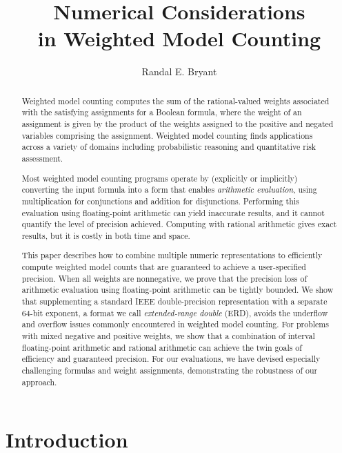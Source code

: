 \documentclass{easychair}
\title{Numerical Considerations \\in Weighted Model Counting}
\author{Randal E. Bryant}
\institute{
  Carnegie Mellon University \\
  Pittsburgh, Pennsylvania 15221, USA
}
\begin{document}
\maketitle

\begin{abstract}
 Weighted model counting computes the sum of the rational-valued weights
  associated with the satisfying assignments for a Boolean formula,
  where the weight of an assignment is given by the product of the
  weights assigned to the positive and negated variables
  comprising the assignment.  Weighted model counting finds
  applications across a variety of domains including probabilistic reasoning
  and quantitative risk assessment.

  Most weighted model counting programs operate by (explicitly or
  implicitly) converting the input formula into a form that enables
  \emph{arithmetic evaluation}, using multiplication for conjunctions
  and addition for disjunctions.  Performing this evaluation using
  floating-point arithmetic can yield inaccurate results, and it
  cannot quantify the level of precision achieved.  Computing with
  rational arithmetic gives exact results, but it is costly in both
  time and space.

  This paper describes how to combine multiple numeric representations
  to efficiently compute weighted model counts that are guaranteed to
  achieve a user-specified precision.  When all weights are
  nonnegative, we prove that the precision loss of arithmetic
  evaluation using floating-point arithmetic can be tightly bounded.
  We show that supplementing a standard IEEE double-precision
  representation with a separate 64-bit exponent, a format we call
  \emph{extended-range double} (ERD), avoids the underflow and overflow
  issues commonly encountered in weighted model counting.  For problems
  with mixed negative and positive weights, we show that a combination of interval
  floating-point arithmetic and rational arithmetic can achieve the
  twin goals of efficiency and guaranteed precision.  For our
  evaluations, we have devised especially challenging formulas and
  weight assignments, demonstrating the robustness of our approach.


\end{abstract}

\section{Introduction}
\end{document}
